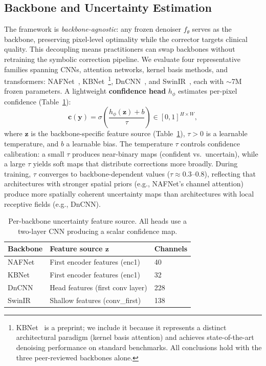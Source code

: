 \documentclass[journal,twoside,web]{ieeecolor}
\begin{document}
\subsection{Backbone and Uncertainty Estimation}
\label{sec:backbone_uncertainty}
The framework is \emph{backbone-agnostic}: any frozen denoiser $f_\theta$ serves as the backbone, preserving pixel-level optimality while the corrector targets clinical quality. This decoupling means practitioners can swap backbones without retraining the symbolic correction pipeline. We evaluate four representative families spanning CNNs, attention networks, kernel basis methods, and transformers: NAFNet~\cite{chen2022simple}, KBNet~\cite{zhang2023kbnet}\footnote{KBNet~\cite{zhang2023kbnet} is a preprint; we include it because it represents a distinct architectural paradigm (kernel basis attention) and achieves state-of-the-art denoising performance on standard benchmarks. All conclusions hold with the three peer-reviewed backbones alone.}, DnCNN~\cite{zhang2017beyond}, and SwinIR~\cite{liang2021swinir}, each with ${\sim}$7M frozen parameters. A lightweight \textbf{confidence head} $h_\phi$ estimates per-pixel confidence (Table~\ref{tab:uncertainty_sources}):
\begin{equation}
\mathbf{c}(\mathbf{y}) = \sigma\!\left(\frac{h_\phi(\mathbf{z}) + b}{\tau}\right) \in [0,1]^{H \times W},
\label{eq:confidence}
\end{equation}
where $\mathbf{z}$ is the backbone-specific feature source (Table~\ref{tab:uncertainty_sources}), $\tau > 0$ is a learnable temperature, and $b$ a learnable bias. The temperature $\tau$ controls confidence calibration: a small $\tau$ produces near-binary maps (confident vs.\ uncertain), while a large $\tau$ yields soft maps that distribute corrections more broadly. During training, $\tau$ converges to backbone-dependent values ($\tau \approx 0.3$--$0.8$), reflecting that architectures with stronger spatial priors (e.g., NAFNet's channel attention) produce more spatially coherent uncertainty maps than architectures with local receptive fields (e.g., DnCNN).

\begin{table}[t]
\centering
\caption{Per-backbone uncertainty feature source. All heads use a two-layer CNN producing a scalar confidence map.}
\label{tab:uncertainty_sources}
\setlength{\tabcolsep}{4pt}
\begin{tabular}{lll}
\toprule
Backbone & Feature source $\mathbf{z}$ & Channels \\
\midrule
NAFNet & First encoder features (enc1) & 40 \\
KBNet & First encoder features (enc1) & 32 \\
DnCNN & Head features (first conv layer) & 228 \\
SwinIR & Shallow features (conv\_first) & 138 \\
\bottomrule
\end{tabular}
\end{table}
\end{document}
